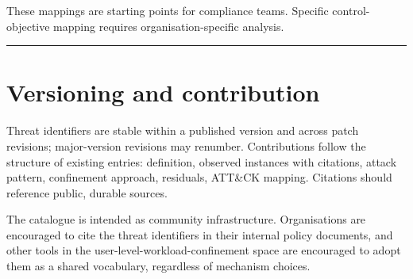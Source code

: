 These mappings are starting points for compliance teams. Specific
control-objective mapping requires organisation-specific analysis.

\begin{center}\rule{0.5\linewidth}{0.5pt}\end{center}

\hypertarget{versioning-and-contribution}{%
\chapter{Versioning and
contribution}\label{versioning-and-contribution}}

Threat identifiers are stable within a published version and across
patch revisions; major-version revisions may renumber. Contributions
follow the structure of existing entries: definition, observed instances
with citations, attack pattern, confinement approach, residuals, ATT\&CK
mapping. Citations should reference public, durable sources.

The catalogue is intended as community infrastructure. Organisations are
encouraged to cite the threat identifiers in their internal policy
documents, and other tools in the user-level-workload-confinement space
are encouraged to adopt them as a shared vocabulary, regardless of
mechanism choices.
